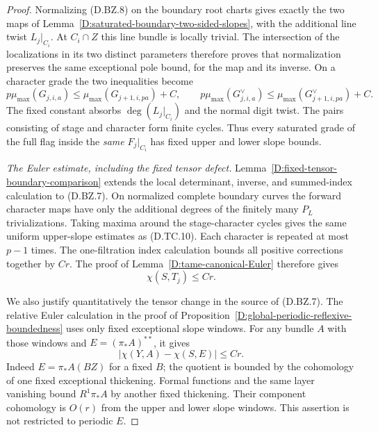 \begin{proof}
Normalizing (D.BZ.8) on the boundary root charts gives
exactly the two maps of
Lemma~\ref{D:saturated-boundary-two-sided-slopes}, with
the additional line twist $L_j|_{C_i}$.  At $C_i\cap Z$
this line bundle is locally trivial.  The intersection
of the localizations in its two distinct parameters
therefore proves that normalization preserves the same
exceptional pole bound, for the map and its inverse.
On a character grade the two inequalities become
\[
 p\mu_{\max}(G_{j,i,a})
       \le\mu_{\max}(G_{j+1,i,pa})+C,\qquad
 p\mu_{\max}(G_{j,i,a}^{\vee})
       \le\mu_{\max}(G_{j+1,i,pa}^{\vee})+C.
                                                        \tag{D.BZ.11}
\]
The fixed constant absorbs $\deg(L_j|_{C_i})$ and the
normal digit twist.  The pairs consisting of stage and
character form finite cycles.  Thus every saturated
grade of the full flag inside the \emph{same} $F_j|_{C_i}$
has fixed upper and lower slope bounds.

\emph{The Euler estimate, including the fixed tensor defect.}
Lemma~\ref{D:fixed-tensor-boundary-comparison} extends the
local determinant, inverse, and summed-index calculation
to (D.BZ.7).  On normalized complete boundary curves the
forward character maps have only the additional degrees
of the finitely many $P_L$ trivializations.  Taking maxima
around the stage-character cycles gives the same uniform
upper-slope estimates as (D.TC.10).  Each character is
repeated at most $p-1$ times.  The one-filtration index
calculation bounds all positive corrections together by
$Cr$.  The proof of Lemma~\ref{D:tame-canonical-Euler}
therefore gives
\[
                         \chi(S,T_j)\le Cr.              \tag{D.BZ.12}
\]

We also justify quantitatively the tensor change in the
source of (D.BZ.7).  The relative Euler calculation in the
proof of Proposition~\ref{D:global-periodic-reflexive-boundedness}
uses only fixed exceptional slope windows.  For any bundle
$A$ with those windows and
$E=(\pi_*A)^{**}$, it gives
\[
                         |\chi(Y,A)-\chi(S,E)|\le Cr.
                                                        \tag{D.BZ.13}
\]
Indeed $E=\pi_*A(BZ)$ for a fixed $B$; the quotient is
bounded by the cohomology of one fixed exceptional
thickening.  Formal functions and the same layer
vanishing bound $R^1\pi_*A$ by another fixed thickening.
Their component cohomology is $O(r)$ from the upper and
lower slope windows.  This assertion is not restricted
to periodic $E$.


\end{proof}
